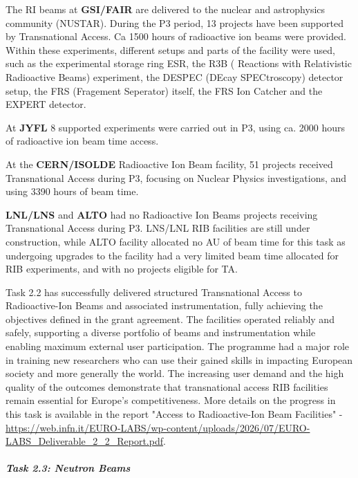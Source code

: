 The RI beams at \textbf{GSI/FAIR} are delivered to the nuclear and astrophysics community (NUSTAR). During the P3 period, 13 projects have been supported by Transnational Access. Ca 1500 hours of radioactive ion beams were provided. Within these experiments, different setups and parts of the facility were used, such as the experimental storage ring ESR, the R3B ( Reactions with Relativistic Radioactive Beams) experiment, the DESPEC (DEcay SPECtroscopy) detector setup, the FRS (Fragement Seperator) itself, the FRS Ion Catcher and the EXPERT detector. 



At \textbf{JYFL} 8 supported experiments were carried out in P3, using ca. 2000 hours of radioactive ion beam time access. 




At the \textbf{CERN/ISOLDE}  Radioactive Ion Beam facility, 51 projects received Transnational Access during P3, focusing on Nuclear Physics investigations, and using 3390 hours of beam time.

\textbf{LNL/LNS} and \textbf{ALTO} had no Radioactive Ion Beams projects receiving Transnational Access during P3. LNS/LNL RIB facilities are still under construction, while ALTO facility allocated no AU of beam time for this task as undergoing upgrades to the facility had a very limited beam time allocated for RIB experiments, and with no projects eligible for TA. 

Task 2.2 has successfully delivered structured Transnational Access to Radioactive-Ion Beams and associated instrumentation, fully achieving the objectives defined in the grant agreement. The facilities operated reliably and safely, supporting a diverse portfolio of beams and instrumentation while enabling maximum external user participation. The programme had a major role in training new researchers who can use their gained skills in impacting European society and more generally the world.  
The increasing user demand and the high quality of the outcomes demonstrate that transnational access RIB facilities remain essential for Europe’s competitiveness.
More details on the progress in this task is available in the report "Access to Radioactive-Ion Beam Facilities" - \url{https://web.infn.it/EURO-LABS/wp-content/uploads/2026/07/EURO-LABS_Deliverable_2_2_Report.pdf}.

\subparagraph{Task 2.3: Neutron Beams} \mbox{}



